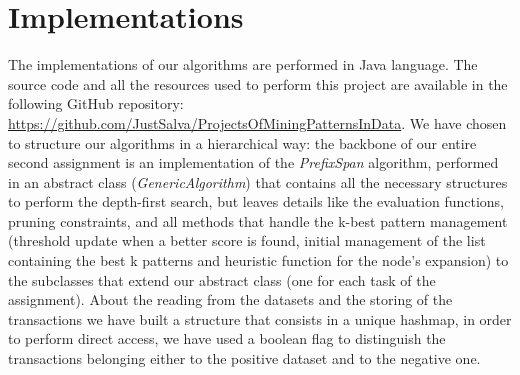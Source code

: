 \documentclass[10pt, a4paper]{article}
\begin{document}
	\section{Implementations}
	The implementations of our algorithms are performed in Java language.\newline
	The source code and all the resources used to perform this project are available in the following GitHub repository: \url{https://github.com/JustSalva/ProjectsOfMiningPatternsInData}.
	We have chosen to structure our algorithms in a hierarchical way: the backbone of our entire second assignment is an implementation of the \textit{PrefixSpan} algorithm, performed in an abstract class (\textit{GenericAlgorithm}) that contains all the necessary structures to perform the depth-first search, but leaves details like the evaluation functions, pruning constraints, and all methods that handle the k-best pattern management (threshold update when a better score is found, initial management of the list containing the best k patterns and heuristic function for the node's expansion) to the subclasses that extend our abstract class (one for each task of the assignment).
	About the reading from the datasets and the storing of the transactions we have built a structure that consists in a unique hashmap, in order to perform direct access, we have used a boolean flag to distinguish the transactions belonging either to the positive dataset and to the negative one.
\end{document}
